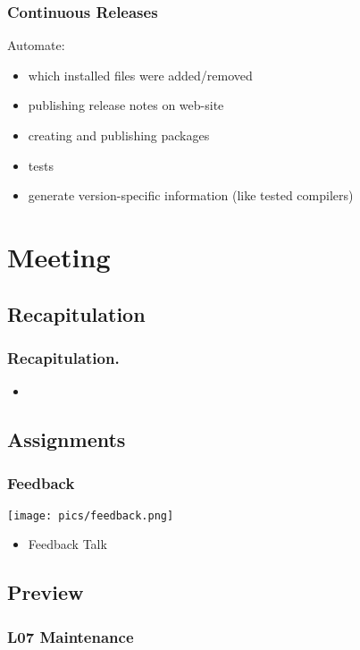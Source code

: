 \begin{frame}
	\frametitle{Continuous Releases}

	Automate:

	\begin{itemize}[<+-| alert@+>]
	\item which installed files were added/removed
	\item publishing release notes on web-site
	\item creating and publishing packages
	\item tests
	\item generate version-specific information (like tested compilers)
	\end{itemize}
\end{frame}

\section{Meeting}

\subsection{Recapitulation}

\begin{frame}
	\frametitle{Recapitulation.}
	\begin{itemize}
		\item 
	\end{itemize}
\end{frame}

\subsection{Assignments}

\begin{frame}
	\frametitle{Feedback}

	\hfill \texttt{[image: pics/feedback.png]}
	\vspace{-1cm}
	\begin{itemize}
		\item Feedback Talk
	\end{itemize}
\end{frame}

\subsection{Preview}

\begin{frame}
	\frametitle{L07 Maintenance}
\end{frame}


\appendix

\begin{frame}[allowframebreaks]
	
	
\end{frame}




